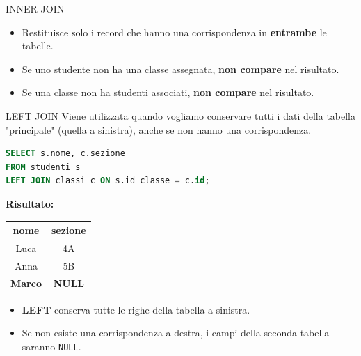 \documentclass{beamer}
\begin{document}
\begin{frame}[fragile]{INNER JOIN}

\begin{center}
\end{center}

\begin{itemize}
    \item Restituisce solo i record che hanno una corrispondenza in \textbf{entrambe} le tabelle.
    \item Se uno studente non ha una classe assegnata, \textbf{non compare} nel risultato.
    \item Se una classe non ha studenti associati, \textbf{non compare} nel risultato.
\end{itemize}
\end{frame}


\begin{frame}[fragile]{LEFT JOIN}
Viene utilizzata quando vogliamo conservare tutti i dati della tabella "principale" (quella a sinistra), anche se non hanno una corrispondenza.

\begin{lstlisting}[language=SQL]
SELECT s.nome, c.sezione
FROM studenti s
LEFT JOIN classi c ON s.id_classe = c.id;
\end{lstlisting}

\textbf{Risultato:}
\begin{center}
\begin{tabular}{|c|c|}
\hline
\textbf{nome} & \textbf{sezione} \\ \hline
Luca & 4A \\ \hline
Anna & 5B \\ \hline
\textbf{Marco} & \textbf{NULL} \\ \hline
\end{tabular}
\end{center}

\begin{itemize}
    \item \textbf{LEFT} conserva tutte le righe della tabella a sinistra.
    \item Se non esiste una corrispondenza a destra, i campi della seconda tabella saranno \texttt{NULL}.
\end{itemize}
\end{frame}
\end{document}
